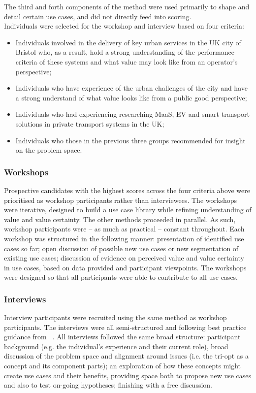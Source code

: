 \documentclass[b5paper,10pt]{article}
\begin{document}
The third and forth components of the method were used primarily to
shape and detail certain use cases, and did not directly feed into
scoring.\\

Individuals were selected for the workshop and interview based on four
criteria: 

\begin{itemize}
\item Individuals involved in the delivery of key urban services in
the UK city of Bristol who, as a result, hold a strong understanding of
the performance criteria of these systems and what value may look like
from an operator’s perspective;
\item Individuals who have experience of the urban challenges of the
city and have a strong understand of what value looks like from a
public good perspective;
\item Individuals who had experiencing researching MaaS, EV and smart
transport solutions in private transport systems in the UK;
\item Individuals who those in the previous three groups recommended for
insight on the problem space.
\end{itemize}

\subsubsection{Workshops}

Prospective candidates with the highest scores across the four
criteria above were prioritised as workshop participants rather than
interviewees. The workshops were iterative, designed to build a use
case library while refining understanding of value and value
certainty. The other methods proceeded in parallel. As such, workshop
participants were -- as much as practical -- constant throughout.
Each workshop was structured in the following manner: presentation of
identified use cases so far; open discussion of possible new use cases
or new segmentation of existing use cases; discussion of evidence on
perceived value and value certainty in use cases, based on data
provided and participant viewpoints. The workshops were designed so
that all participants were able to contribute to all use cases.

\subsubsection{Interviews}

Interview participants were recruited using the same method as
workshop participants. The interviews were all semi-structured and
following best practice guidance from ~\citet{king+horrocks:2010}. All
interviews followed the same broad structure: participant background
(e.g. the individual's experience and their current role), broad
discussion of the problem space and alignment around issues (i.e. the
tri-opt as a concept and its component parts); an exploration of how
these concepts might create use cases and their benefits, providing
space both to propose new use cases and also to test on-going
hypotheses; finishing with a free discussion.
\end{document}
